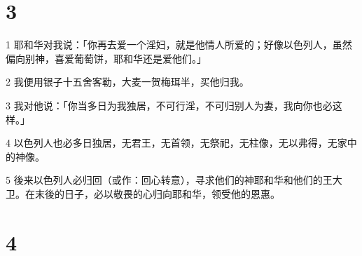\chapter{3}

\par 1 耶和华对我说：「你再去爱一个淫妇，就是他情人所爱的；好像以色列人，虽然偏向别神，喜爱葡萄饼，耶和华还是爱他们。」
\par 2 我便用银子十五舍客勒，大麦一贺梅珥半，买他归我。
\par 3 我对他说：「你当多日为我独居，不可行淫，不可归别人为妻，我向你也必这样。」
\par 4 以色列人也必多日独居，无君王，无首领，无祭祀，无柱像，无以弗得，无家中的神像。
\par 5 後来以色列人必归回（或作：回心转意），寻求他们的神耶和华和他们的王大卫。在末後的日子，必以敬畏的心归向耶和华，领受他的恩惠。

\chapter{4}

